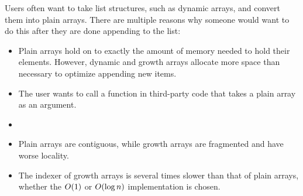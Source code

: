 \descriptn

Users often want to take list structures, such as dynamic arrays, and convert them into plain arrays. There are multiple reasons why someone would want to do this after they are done appending to the list:

\begin{itemize}
	\item Plain arrays hold on to exactly the amount of memory needed to hold their elements. However, dynamic and growth arrays allocate more space than necessary to optimize appending new items.
	\item The user wants to call a function in third-party code that takes a plain array as an argument.
	\item
	\item Plain arrays are contiguous, while growth arrays are fragmented and have worse locality.
	\item The indexer of growth arrays is several times slower than that of plain arrays, whether the $O(1)$ or $O(\log n)$ implementation is chosen.
\end{itemize}